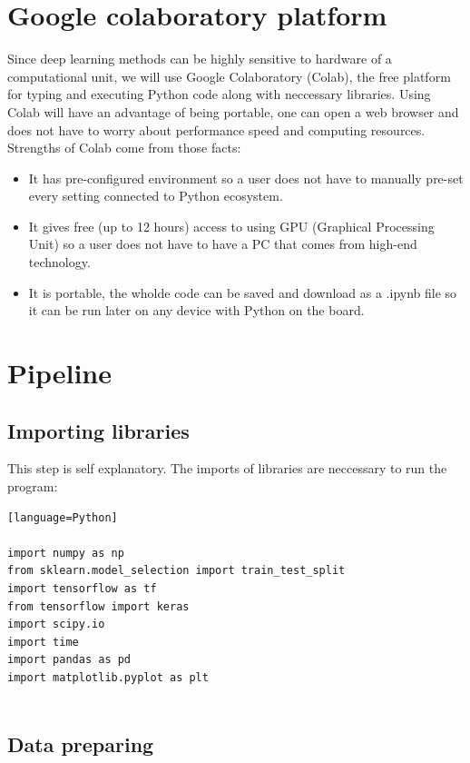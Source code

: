 \documentclass[a4paper,oneside,openright,11pt]{book}
\begin{document}
\section{Google colaboratory platform}

Since deep learning methods can be highly sensitive to hardware of a computational unit, we will use Google Colaboratory (Colab), the free platform for typing and executing Python code along with neccessary libraries. Using Colab will have an advantage of being portable, one can open a web browser and does not have to worry about performance speed and computing resources. Strengths of Colab come from those facts:

\begin{itemize}
    \item It has pre-configured environment so a user does not have to manually pre-set every setting connected to Python ecosystem.
    \item It gives free (up to 12 hours) access to using GPU (Graphical Processing Unit) so a user does not have to have a PC that comes from high-end technology.
    \item It is portable, the wholde code can be saved and download as a .ipynb file so it can be run later on any device with Python on the board.
\end{itemize}


\section{Pipeline}

\subsection{Importing libraries}

This step is self explanatory. The imports of libraries are neccessary to run the program:

\begin{verbatim}[language=Python]

import numpy as np
from sklearn.model_selection import train_test_split
import tensorflow as tf
from tensorflow import keras
import scipy.io
import time
import pandas as pd
import matplotlib.pyplot as plt


\end{verbatim}


\subsection{Data preparing}
\end{document}
